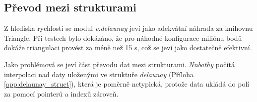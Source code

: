 \documentclass[12pt,a4paper]{article}
\begin{document}
\begin{figure}[h!]
\centering
\begin{floatrow}
\end{floatrow}
\end{figure}

\subsection{Převod mezi strukturami}
Z hlediska rychlosti se modul \emph{v.delaunay} jeví jako adekvátní náhrada za knihovnu Triangle. Při testech bylo dokázáno, že pro náhodné konfigurace miliónu bodů dokáže triangulaci provést za méně než 15 s, což se jeví jako dostatečně efektivní.

Jako problémová se jeví část převodu dat mezi strukturami. \emph{Nnbathy} počítá interpolaci nad daty uloženými ve struktuře \emph{delaunay} (Příloha \ref{app:delaunay_struct}), která je poměrně netypická, protože data ukládá do polí za pomocí pointerů a indexů zároveň. 
\end{document}
